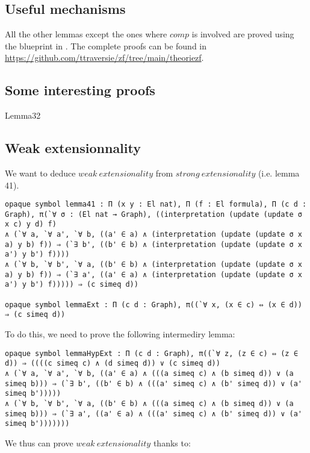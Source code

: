\documentclass[a4paper]{article}
\begin{document}
\subsection{Useful mechanisms}

All the other lemmas except the ones where $comp$ is involved are proved using the blueprint in \cite{zermodulo53}. The complete proofs can be found in \url{https://github.com/ttraversie/zf/tree/main/theoriezf}.

\subsection{Some interesting proofs}

Lemma32

\subsection{Weak extensionnality}

We want to deduce $weak \ extensionality$ from $strong \ extensionality$ (i.e. lemma 41).

\begin{lstlisting}
opaque symbol lemma41 : Π (x y : El nat), Π (f : El formula), Π (c d : Graph), π(`∀ σ : (El nat → Graph), ((interpretation (update (update σ x c) y d) f)
∧ (`∀ a, `∀ a', `∀ b, ((a' ∈ a) ∧ (interpretation (update (update σ x a) y b) f)) ⇒ (`∃ b', ((b' ∈ b) ∧ (interpretation (update (update σ x a') y b') f))))
∧ (`∀ b, `∀ b', `∀ a, ((b' ∈ b) ∧ (interpretation (update (update σ x a) y b) f)) ⇒ (`∃ a', ((a' ∈ a) ∧ (interpretation (update (update σ x a') y b') f))))) ⇒ (c simeq d))

opaque symbol lemmaExt : Π (c d : Graph), π((`∀ x, (x ∈ c) ⇔ (x ∈ d)) ⇒ (c simeq d))
\end{lstlisting}

To do this, we need to prove the following intermediry lemma:

\begin{lstlisting}
opaque symbol lemmaHypExt : Π (c d : Graph), π((`∀ z, (z ∈ c) ⇔ (z ∈ d)) ⇒ ((((c simeq c) ∧ (d simeq d)) ∨ (c simeq d))
∧ (`∀ a, `∀ a', `∀ b, ((a' ∈ a) ∧ (((a simeq c) ∧ (b simeq d)) ∨ (a simeq b))) ⇒ (`∃ b', ((b' ∈ b) ∧ (((a' simeq c) ∧ (b' simeq d)) ∨ (a' simeq b')))))
∧ (`∀ b, `∀ b', `∀ a, ((b' ∈ b) ∧ (((a simeq c) ∧ (b simeq d)) ∨ (a simeq b))) ⇒ (`∃ a', ((a' ∈ a) ∧ (((a' simeq c) ∧ (b' simeq d)) ∨ (a' simeq b')))))))
\end{lstlisting}

We thus can prove $weak \ extensionality$ thanks to:
\end{document}
